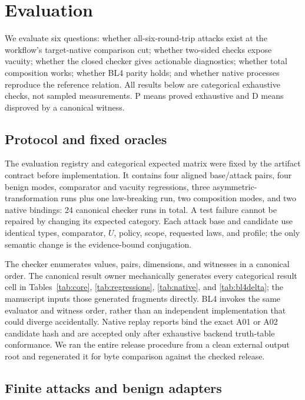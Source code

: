 \documentclass[sigconf,anonymous,review]{acmart}
\begin{document}
\section{Evaluation}
\label{sec:evaluation}

We evaluate six questions: whether all-six-round-trip attacks exist at
the workflow's target-native comparison cut; whether two-sided checks expose
vacuity; whether
the closed checker gives actionable diagnostics; whether total
composition works; whether BL4 parity holds; and whether native
processes reproduce the reference relation.  All results below are
categorical exhaustive checks, not sampled measurements.  \textsf{P}
means proved exhaustive and \textsf{D} means disproved by a canonical
witness.

\subsection{Protocol and fixed oracles}

The evaluation registry and categorical expected matrix were fixed by
the artifact contract before implementation.  It contains four aligned
base/attack pairs, four benign modes, comparator and vacuity
regressions, three asymmetric-transformation runs plus one
law-breaking run, two composition modes, and two native bindings: 24
canonical checker runs in total.  A test failure cannot be repaired by
changing its expected category.  Each attack base and candidate use
identical types, comparator, $U$, policy, scope, requested laws, and
profile; the only semantic change is the evidence-bound conjugation.

The checker enumerates values, pairs, dimensions, and witnesses in a
canonical order.  The canonical result owner mechanically generates every
categorical result cell in Tables~\ref{tab:core}, \ref{tab:regressions},
\ref{tab:native}, and \ref{tab:bl4delta}; the manuscript inputs those generated
fragments directly.  BL4 invokes the same evaluator and witness order, rather
than an independent implementation that could diverge accidentally.  Native
replay reports bind the exact A01 or A02 candidate hash and are accepted only
after exhaustive backend truth-table conformance.  We ran the entire release
procedure from a clean external output root and regenerated it for byte
comparison against the checked release.

\subsection{Finite attacks and benign adapters}
\end{document}
